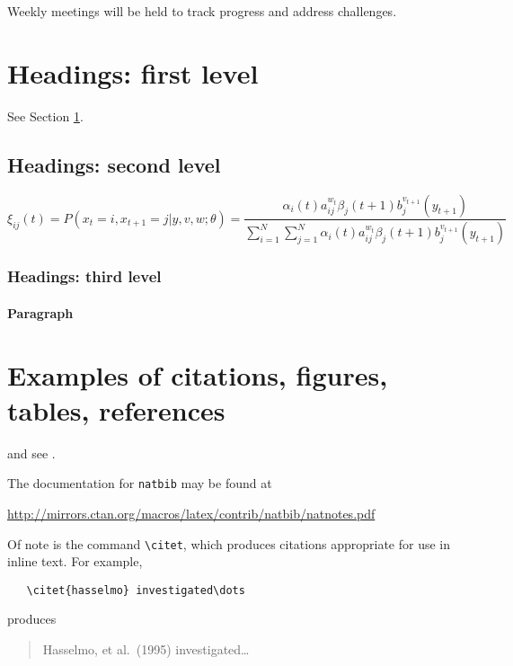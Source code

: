\documentclass{article}
\begin{document}
Weekly meetings will be held to track progress and address challenges.


  



\section{Headings: first level}
\label{sec:headings}

\lipsum[4] See Section \ref{sec:headings}.

\subsection{Headings: second level}
\lipsum[5]
\begin{equation}
\xi _{ij}(t)=P(x_{t}=i,x_{t+1}=j|y,v,w;\theta)= {\frac {\alpha _{i}(t)a^{w_t}_{ij}\beta _{j}(t+1)b^{v_{t+1}}_{j}(y_{t+1})}{\sum _{i=1}^{N} \sum _{j=1}^{N} \alpha _{i}(t)a^{w_t}_{ij}\beta _{j}(t+1)b^{v_{t+1}}_{j}(y_{t+1})}}
\end{equation}

\subsubsection{Headings: third level}
\lipsum[6]

\paragraph{Paragraph}

\lipsum[7]

\section{Examples of citations, figures, tables, references}
\label{sec:others}
\lipsum[8] \cite{dhariwal2021,kour2014fast} and see \cite{hadash2018estimate}.

The documentation for \verb+natbib+ may be found at
\begin{center}
  \url{http://mirrors.ctan.org/macros/latex/contrib/natbib/natnotes.pdf}
\end{center}
Of note is the command \verb+\citet+, which produces citations
appropriate for use in inline text.  For example,
\begin{verbatim}
   \citet{hasselmo} investigated\dots
\end{verbatim}
produces
\begin{quote}
  Hasselmo, et al.\ (1995) investigated\dots
\end{quote}
\end{document}
